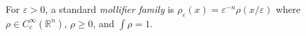 
For $\varepsilon>0$, a standard \emph{mollifier family} is $\rho_\varepsilon(x)=\varepsilon^{-n}\rho(x/\varepsilon)$ where $\rho\in C_c^\infty(\mathbb R^n)$, $\rho\ge0$, and $\int\rho=1$.
